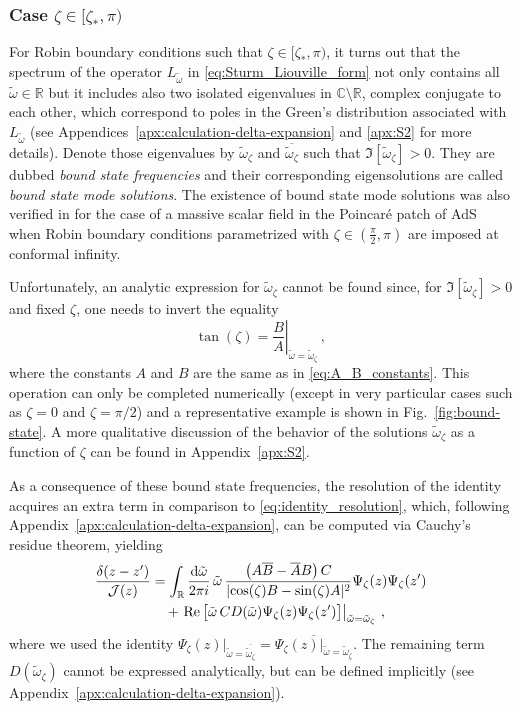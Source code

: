 \documentclass[aps, prd, amsmath, floats, floatfix, twocolumn, nofootinbib, superscriptaddress, showpacs]{revtex4-1}
\def\bC{{\mathbb C}}
\def\bR{{\mathbb R}}
\def\tomega{{\tilde{\omega}}}
\begin{document}
\subsubsection{Case $\zeta\in[\zeta_*,\pi)$}

For Robin boundary conditions such that $\zeta\in[\zeta_*,\pi)$, it turns out that the spectrum of the operator $L_\tomega$ in \eqref{eq:Sturm_Liouville_form} not only contains all $\tilde{\omega} \in \bR$ but it includes also two isolated eigenvalues in $\bC \setminus \bR$, complex conjugate to each other, which correspond to poles in the Green's distribution associated with $L_\tomega$ (see Appendices~\ref{apx:calculation-delta-expansion} and \ref{apx:S2} for more details). Denote those eigenvalues by $\tilde{\omega}_\zeta$ and $\overline{\tilde{\omega}_\zeta}$ such that $\Im[\tilde{\omega}_\zeta]>0$. They are dubbed {\em bound state frequencies} and their corresponding eigensolutions are called {\em bound state mode solutions}. The existence of bound state mode solutions was also verified in \cite{Dappiaggi:2016fwc} for the case of a massive scalar field in the Poincar\'e patch of AdS when Robin boundary conditions parametrized with $\zeta \in (\frac{\pi}{2},\pi)$ are imposed at conformal infinity.

Unfortunately, an analytic expression for $\tilde{\omega}_\zeta$ cannot be found since, for $\Im[\tilde{\omega}_\zeta]>0$ and fixed $\zeta$, one needs to invert the equality
%
$$\tan(\zeta) = \left.\frac{B}{A}\right|_{\tilde{\omega} = \tilde{\omega}_\zeta} \, , $$
%
where the constants $A$ and $B$ are the same as in \eqref{eq:A_B_constants}. This operation can only be completed numerically (except in very particular cases such as $\zeta=0$ and $\zeta=\pi/2$) and a representative example is shown in Fig.~\ref{fig:bound-state}. A more qualitative discussion of the behavior of the solutions $\tomega_\zeta$ as a function of $\zeta$ can be found in Appendix~\ref{apx:S2}.

As a consequence of these bound state frequencies, the resolution of the identity acquires an extra term in comparison to \eqref{eq:identity_resolution}, which, following Appendix~\ref{apx:calculation-delta-expansion}, can be computed via Cauchy's residue theorem, yielding
%
\begin{align}
\frac{\delta(z-z^\prime)}{\mathcal{J}(z)} &= \int_{\bR} \frac{\dd\tilde{\omega}}{2\pi i} \, \tilde{\omega} \, \frac{\left(A\overline{B}-\overline{A}B\right) C}{|{\cos(\zeta) B-\sin(\zeta)A}|^2} \Psi_{\zeta}(z)\Psi_{\zeta}(z') \notag \\
&\quad + \left. \Re\big[\tilde{\omega} \, C D(\tilde{\omega})\Psi_{\zeta}(z)\Psi_{\zeta}(z^\prime)\big]\right|_{\tilde{\omega} = \tilde{\omega}_\zeta} \, , \label{eq:delta-res-withBS}
\end{align}
%
where we used the identity $\Psi_{\zeta}(z)|_{\tilde{\omega} = \overline{\tilde{\omega}_\zeta}} = \overline{\Psi_{\zeta}(z)|_{\tilde{\omega} = \tilde{\omega}_\zeta}}$. The remaining term $D(\tilde{\omega}_\zeta)$ cannot be expressed analytically, but can be defined implicitly (see Appendix~\ref{apx:calculation-delta-expansion}). 
\end{document}
